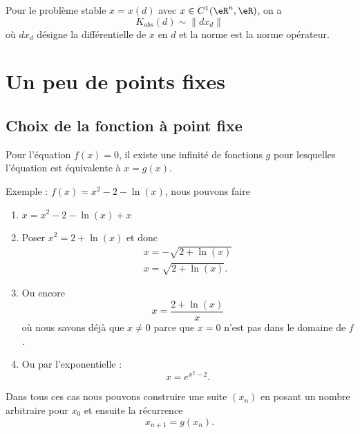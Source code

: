 \begin{proposition}
	Pour le problème stable \( x=x(d)\) avec \( x\in C^1(\eR^n,\eR)\), on a
	\begin{equation}
		K_{abs}(d)\sim\| dx_d \|
	\end{equation}
	où \( dx_d\) désigne la différentielle de \( x\) en \( d\) et la norme est la norme opérateur.
\end{proposition}

\section{Un peu de points fixes}
\label{SECooWUVTooMhmvaW}

\subsection{Choix de la fonction à point fixe}

Pour l'équation \( f(x)=0\), il existe une infinité de fonctions \( g\) pour lesquelles l'équation est équivalente à \( x=g(x)\).

Exemple : \( f(x)=x^2-2-\ln(x)\), nous pouvons faire
\begin{enumerate}
	\item
	      \( x=x^2-2-\ln(x)+x\)
	\item
	      Poser \( x^2=2+\ln(x)\) et donc
	      \begin{subequations}
		      \begin{align}
			      x=-\sqrt{2+\ln(x)} \\
			      x=\sqrt{2+\ln(x)}.
		      \end{align}
	      \end{subequations}
	\item
	      Ou encore
	      \begin{equation}
		      x=\frac{ 2+\ln(x) }{ x }
	      \end{equation}
	      où nous savons déjà que \( x\neq 0\) parce que \( x=0\) n'est pas dans le domaine de \( f\).
	\item
	      Ou par l'exponentielle :
	      \begin{equation}
		      x= e^{x^2-2}.
	      \end{equation}
\end{enumerate}
Dans tous ces cas nous pouvons construire une suite \( (x_n)\) en posant un nombre arbitraire pour \( x_0\) et ensuite la récurrence
\begin{equation}
	x_{n+1}=g(x_n).
\end{equation}

